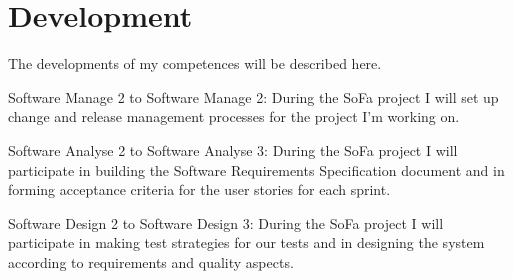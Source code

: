 \section{Development}
The developments of my competences will be described here.

Software Manage 2 to Software Manage 2:
During the SoFa project I will set up change and release management processes for the project I'm working on.

Software Analyse 2 to Software Analyse 3:
During the SoFa project I will participate in building the Software Requirements Specification document and in forming acceptance criteria for the user stories for each sprint.

Software Design 2 to Software Design 3:
During the SoFa project I will participate in making test strategies for our tests and in designing the system according to requirements and quality aspects.